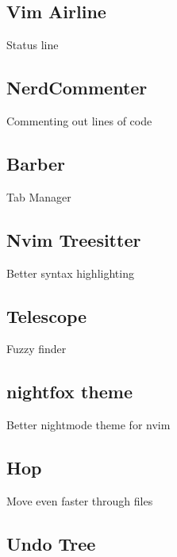 \documentclass{article}
\begin{document}
\subsection{Vim Airline}
Status line

\subsection{NerdCommenter}
Commenting out lines of code

\subsection{Barber}
Tab Manager

\subsection{Nvim Treesitter}
Better syntax highlighting

\subsection{Telescope}
Fuzzy finder

\subsection{nightfox theme}
Better nightmode theme for nvim

\subsection{Hop}
Move even faster through files

\subsection{Undo Tree}
 
\end{document}
